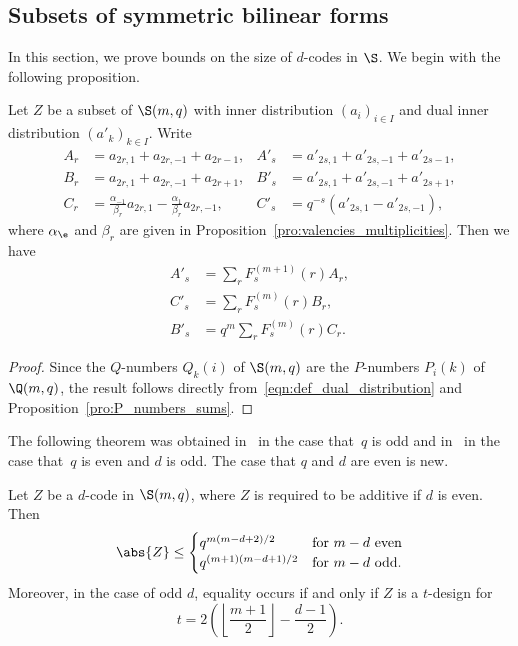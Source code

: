 %

\subsection{Subsets of symmetric bilinear forms}

In this section, we prove bounds on the size of $d$-codes in $\S$. We begin with the following proposition.
\begin{prop}
\label{pro:inner_dist_S}
Let $Z$ be a subset of $\S(m,q)$ with inner distribution $(a_i)_{i\in I}$ and dual inner distribution $(a'_k)_{k\in I}$. Write 
\begin{align*}
A_r&=a_{2r,1}+a_{2r,-1}+a_{2r-1}, & 
A'_s&=a'_{2s,1}+a'_{2s,-1}+a'_{2s-1},\\
B_r&=a_{2r,1}+a_{2r,-1}+a_{2r+1},&
B'_s&=a'_{2s,1}+a'_{2s,-1}+a'_{2s+1},\\
C_r&=\frac{\alpha_{-1}}{\beta_r}a_{2r,1}-\frac{\alpha_{1}}{\beta_r}a_{2r,-1},&
C'_s&=q^{-s}(a'_{2s,1}-a'_{2s,-1}),
\end{align*}
where $\alpha_\e$ and $\beta_r$ are given in Proposition~\ref{pro:valencies_multiplicities}. Then we have
\begin{align*}
A'_s&=\sum_rF^{(m+1)}_s(r)A_r,\\
C'_s&=\sum_rF^{(m)}_s(r)B_r,\\
B'_s&=q^m\sum_rF^{(m)}_s(r)C_r.
\end{align*}
\end{prop}
\begin{proof}
Since the $Q$-numbers $Q_k(i)$ of $\S(m,q)$ are the $P$-numbers $P_i(k)$ of $\Q(m,q)$, the result follows directly from~\eqref{eqn:def_dual_distribution} and Proposition~\ref{pro:P_numbers_sums}.
\end{proof}
\par
The following theorem was obtained in~\cite{Sch2015} in the case that~$q$ is odd and in~\cite{Sch2010} in the case that~$q$ is even and $d$ is odd. The case that $q$ and $d$ are even is new.
\begin{theorem}
\label{thm:bounds_S}
Let $Z$ be a $d$-code in $\S(m,q)$, where $Z$ is required to be additive if $d$ is even. Then
\[
\abs{Z}\le\begin{cases}
q^{m(m-d+2)/2} & \text{for $m-d$ even}\\
q^{(m+1)(m-d+1)/2} & \text{for $m-d$ odd}.
\end{cases}
\]
Moreover, in the case of odd $d$, equality occurs if and only if $Z$ is a $t$-design for
\[
t=2\left(\left\lfloor\frac{m+1}{2}\right\rfloor-\frac{d-1}{2}\right).
\]
\end{theorem}
